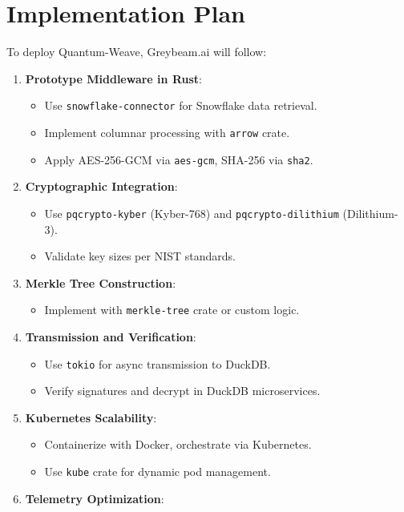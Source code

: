 \documentclass[12pt]{article}
\begin{document}
\section{Implementation Plan}
To deploy Quantum-Weave, Greybeam.ai will follow:
\begin{enumerate}
    \item \textbf{Prototype Middleware in Rust}:
        \begin{itemize}
            \item Use \texttt{snowflake-connector} for Snowflake data retrieval.
            \item Implement columnar processing with \texttt{arrow} crate.
            \item Apply AES-256-GCM via \texttt{aes-gcm}, SHA-256 via \texttt{sha2}.
        \end{itemize}
    \item \textbf{Cryptographic Integration}:
        \begin{itemize}
            \item Use \texttt{pqcrypto-kyber} (Kyber-768) and \texttt{pqcrypto-dilithium} (Dilithium-3).
            \item Validate key sizes per NIST standards.
        \end{itemize}
    \item \textbf{Merkle Tree Construction}:
        \begin{itemize}
            \item Implement with \texttt{merkle-tree} crate or custom logic.
        \end{itemize}
    \item \textbf{Transmission and Verification}:
        \begin{itemize}
            \item Use \texttt{tokio} for async transmission to DuckDB.
            \item Verify signatures and decrypt in DuckDB microservices.
        \end{itemize}
    \item \textbf{Kubernetes Scalability}:
        \begin{itemize}
            \item Containerize with Docker, orchestrate via Kubernetes.
            \item Use \texttt{kube} crate for dynamic pod management.
        \end{itemize}
    \item \textbf{Telemetry Optimization}:

\end{enumerate}
\end{document}
